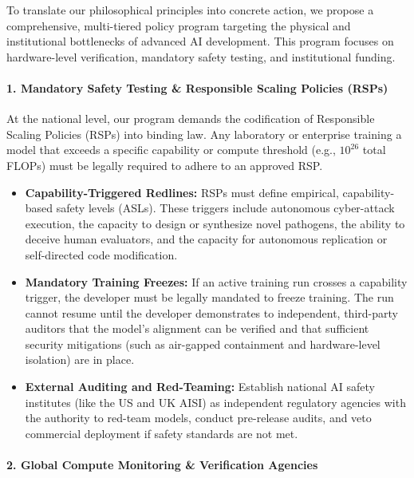 To translate our philosophical principles into concrete action, we
propose a comprehensive, multi-tiered policy program targeting the
physical and institutional bottlenecks of advanced AI development. This
program focuses on hardware-level verification, mandatory safety
testing, and institutional funding.

\paragraph{1. Mandatory Safety Testing \& Responsible Scaling Policies
(RSPs)}\label{mandatory-safety-testing-responsible-scaling-policies-rsps}

At the national level, our program demands the codification of
Responsible Scaling Policies (RSPs) into binding law. Any laboratory or
enterprise training a model that exceeds a specific capability or
compute threshold (e.g., \(10^{26}\) total FLOPs) must be legally
required to adhere to an approved RSP.

\begin{itemize}
\tightlist
\item
  \textbf{Capability-Triggered Redlines:} RSPs must define empirical,
  capability-based safety levels (ASLs). These triggers include
  autonomous cyber-attack execution, the capacity to design or
  synthesize novel pathogens, the ability to deceive human evaluators,
  and the capacity for autonomous replication or self-directed code
  modification.
\item
  \textbf{Mandatory Training Freezes:} If an active training run crosses
  a capability trigger, the developer must be legally mandated to freeze
  training. The run cannot resume until the developer demonstrates to
  independent, third-party auditors that the model's alignment can be
  verified and that sufficient security mitigations (such as air-gapped
  containment and hardware-level isolation) are in place.
\item
  \textbf{External Auditing and Red-Teaming:} Establish national AI
  safety institutes (like the US and UK AISI) as independent regulatory
  agencies with the authority to red-team models, conduct pre-release
  audits, and veto commercial deployment if safety standards are not
  met.
\end{itemize}

\paragraph{2. Global Compute Monitoring \& Verification
Agencies}\label{global-compute-monitoring-verification-agencies}

